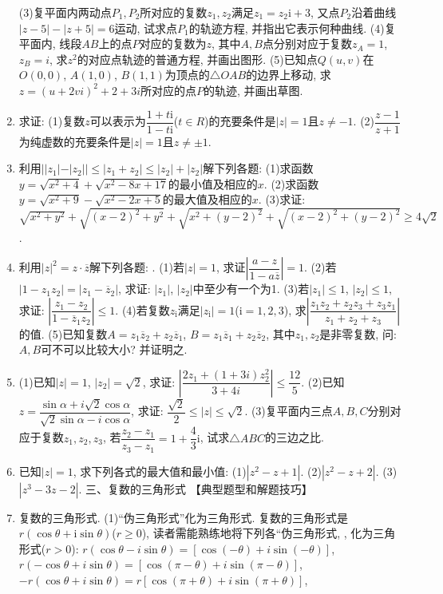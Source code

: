 \documentclass[10pt,a4paper]{article}
\begin{document}
\begin{enumerate}[1.]
(3)复平面内两动点$P_1,P_2$所对应的复数$z_1,z_2$满足$z_1=z_2\mathrm{i}+3$, 又点$P_2$沿着曲线$|z-5|-|z+5|=6$运动, 试求点$P_1$的轨迹方程, 并指出它表示何种曲线.
(4)复平面内, 线段$AB$上的点$P$对应的复数为$z$, 其中$A,B$点分别对应于复数$z_A=1$, $z_B=i$, 求$z^2$的对应点轨迹的普通方程, 并画出图形.
(5)已知点$Q(u,v)$在$O(0,0)$, $A(1,0)$, $B(1,1)$为顶点的$\triangle OAB$的边界上移动, 求$z=(u+2vi)^2+2+3i$所对应的点$P$的轨迹, 并画出草图.
\item 求证:
(1)复数$z$可以表示为$\dfrac{1+t\mathrm{i}}{1-t\mathrm{i}}$($t\in R$)的充要条件是$|z|=1$且$z\ne -1$.
(2)$\dfrac{z-1}{z+1}$为纯虚数的充要条件是$|z|=1$且$z\ne \pm 1$.
\item 利用$||z_1|-|z_2||\le|z_1+z_2|\le|z_2|+|z_2|$解下列各题:
(1)求函数$y=\sqrt {x^2+4}+\sqrt {x^2-8x+17}$的最小值及相应的$x$.
(2)求函数$y=\sqrt {x^2+9}-\sqrt {x^2-2x+5}$的最大值及相应的$x$.
(3)求证: $\sqrt {x^2+y^2}+\sqrt {(x-2)^2+y^2}+\sqrt {x^2+(y-2)^2}+\sqrt {(x-2)^2+(y-2)^2}\ge 4\sqrt 2$.
\item 利用$|z|^2=z\cdot \overline z$解下列各题: .
(1)若$|z|=1$, 求证$|\dfrac{a-z}{1-a\overline z}|=1$.
(2)若$|1-z_1z_2|=|z_1-\overline z_2|$, 求证: $|z_1|$, $|z_2|$中至少有一个为1.
(3)若$|z_1|\le 1$, $|z_2|\le 1$, 求证: $|\dfrac{{z_1}-{z_2}}{1-{{\overline z}_1}{z_2}}|\le 1$.
(4)若复数$z_{\mathrm{i}}$满足$|z_{\mathrm{i}}|=1$($\mathrm{i}=1,2,3$), 求$|\dfrac{{z_1}{z_2}+{z_2}{z_3}+{z_3}{z_1}}{{z_1}+{z_2}+{z_3}}|$的值.
(5)已知复数$A=z_1\overline z_2+z_2\overline z_1$, $B=z_1\overline z_1+z_2\overline z_2$, 其中$z_1,z_2$是非零复数, 问: $A,B$可不可以比较大小? 并证明之.
\item (1)已知$|z|=1$, $|z_2|=\sqrt 2$, 求证: $|\dfrac{2{z_1}+(1+3i)z_2^2}{3+4i}|\le \dfrac{12}5$.
(2)已知$z=\dfrac{\sin \alpha +i\sqrt 2\cos \alpha }{\sqrt 2\sin \alpha -i\cos \alpha }$, 求证: $\dfrac{\sqrt 2}2\le|z|\le \sqrt 2$.
(3)复平面内三点$A,B,C$分别对应于复数$z_1,z_2,z_3$, 若$\dfrac{{z_2}-{z_1}}{{z_3}-{z_1}}=1+\dfrac 43\mathrm{i}$, 试求$\triangle ABC$的三边之比.
\item 已知$|z|=1$, 求下列各式的最大值和最小值:
(1)$|z^2-z+1|$.		(2)$|z^2-z+2|$.		(3)$|z^3-3z-2|$.
三、复数的三角形式
【典型题型和解题技巧】
\item 复数的三角形式.
(1)``伪三角形式''化为三角形式.
复数的三角形式是$r(\cos \theta +\mathrm{i}\sin \theta)$($r\ge 0$), 读者需能熟练地将下列各``伪三角形式, , 化为三角形式($r>0$):
$r(\cos \theta -i\sin \theta)=[\cos (-\theta)+i\sin (-\theta)]$, $r(-\cos \theta +i\sin \theta)=[\cos (\pi -\theta)+i\sin (\pi -\theta)]$, $-r(\cos \theta +i\sin \theta)=r[\cos (\pi +\theta)+i\sin (\pi +\theta)]$,

\end{enumerate}
\end{document}
